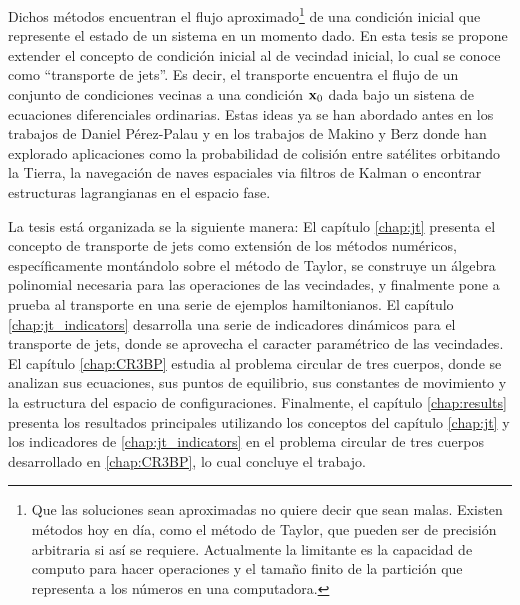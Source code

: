 Dichos métodos encuentran el flujo aproximado\footnote{Que las soluciones sean aproximadas no quiere decir que sean malas. Existen métodos hoy en día, como el método de Taylor, que pueden ser de precisión arbitraria si así se requiere. Actualmente la limitante es la capacidad de computo para hacer operaciones y el tamaño finito de la partición que representa a los números en una computadora.} de una condición inicial que represente el estado de un sistema en un momento dado. En esta tesis se propone extender el concepto de condición inicial al de vecindad inicial, lo cual se conoce como ``transporte de jets''. Es decir, el transporte encuentra el flujo de un conjunto de condiciones vecinas a una condición $\mathbf{x}_0$ dada bajo un sistena de ecuaciones diferenciales ordinarias. Estas ideas ya se han abordado antes en los trabajos de Daniel Pérez-Palau \cite{Daniel2015, Perez2013, Perez2015} y en los trabajos de Makino y Berz \cite{Berz1991,Berz1998} donde han explorado aplicaciones como la probabilidad de colisión entre satélites orbitando la Tierra, la navegación de naves espaciales via filtros de Kalman o  encontrar estructuras lagrangianas en el espacio fase.

La tesis está organizada se la siguiente manera: El capítulo \ref{chap:jt} presenta el concepto de transporte de jets como extensión de los métodos numéricos, específicamente montándolo sobre el método de Taylor, se construye un álgebra polinomial necesaria para las operaciones de las vecindades, y finalmente pone a prueba al transporte en una serie de ejemplos hamiltonianos. El capítulo \ref{chap:jt_indicators} desarrolla una serie de indicadores dinámicos para el transporte de jets, donde se aprovecha el caracter paramétrico de las vecindades. El capítulo \ref{chap:CR3BP} estudia al problema circular de tres cuerpos, donde se analizan sus ecuaciones, sus puntos de equilibrio, sus constantes de movimiento y la estructura del espacio de configuraciones. Finalmente, el capítulo \ref{chap:results} presenta los resultados principales utilizando los conceptos del capítulo \ref{chap:jt} y los indicadores de \ref{chap:jt_indicators} en el problema circular de tres cuerpos desarrollado en \ref{chap:CR3BP}, lo cual concluye el trabajo. 


